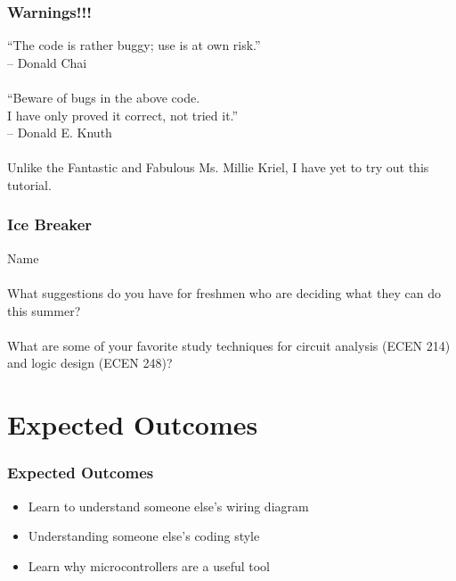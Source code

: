 \documentclass[xcolor={usenames,dvipsnames},hyperref={hyperindex,bookmarks}]{beamer}
\begin{document}
\frame
{
	\frametitle{Warnings!!!}

	``The code is rather buggy; use is at own risk.'' \\
	-- Donald Chai \\
	\ \\
	``Beware of bugs in the above code. \\
	I have only proved it correct, not tried it.'' \\
	-- Donald E. Knuth \ \\
	\ \\
	Unlike the Fantastic and Fabulous Ms. Millie Kriel, I have yet to try out this tutorial.
}




\frame
{
	\frametitle{Ice Breaker}

	Name \\
	\ \\
	What suggestions do you have for freshmen who are deciding what they can do this summer? \\
	\ \\
	What are some of your favorite study techniques for circuit analysis (ECEN 214) and logic design (ECEN 248)? \\
}








\section{Expected Outcomes}

\frame
{
	\frametitle{Expected Outcomes}

	\begin{itemize}
	\item Learn to understand someone else's wiring diagram
	\item Understanding someone else's coding style
	\item Learn why microcontrollers are a useful tool
	\end{itemize}
}











\end{document}
